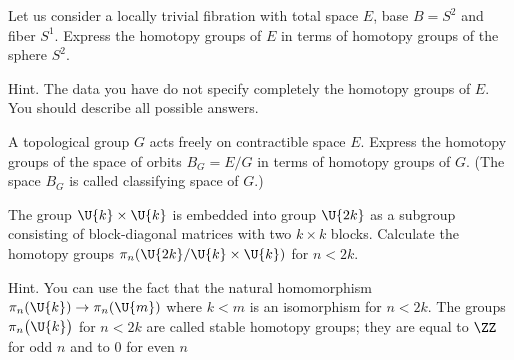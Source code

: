 \exercises
\begin{xca}
Let us consider a locally trivial fibration with total space $E$,
base $B=S^2$ and fiber $S^{1}$. Express the homotopy groups of
$E$ in terms of homotopy groups of the sphere $S^2$.

Hint. The data you have do not specify completely the homotopy
groups of $E$. You should describe all possible answers.
\end{xca}
\begin{xca}
A topological group $G$ acts freely on contractible space
$E$. Express the homotopy groups of the space of orbits $B_{G} =
E/G$ in terms of homotopy groups of $G$. (The space $B_{G}$ is
called classifying space of $G$.)
\end{xca}
\begin{xca}
The group $\U{k}\times\U{k}$ is embedded into group $\U{2k}$ as a
subgroup consisting of block-diagonal matrices with two $k\times
k$ blocks. Calculate the homotopy groups
$\pi_{n}(\U{2k}/\U{k}\times\U{k})$ for $n < 2k$.


Hint. You can use the fact that the natural homomorphism
$\pi_{n}(\U{k})\to\pi_{n}(\U{m})$ where $k<m$ is an isomorphism
for $n < 2k$. The groups $\pi_{n}\bigl(\U{k}\bigr)$ for $n<2k$
are called stable homotopy groups;%
they are equal to $\ZZ$ for odd $n$ and to $0$ for even $n$
\end{xca}
